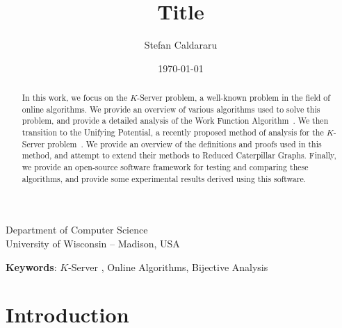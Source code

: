 \documentclass[11pt]{article}
\title{Title}
\author[1]{Stefan Caldararu}
\affil[1]{Undergraduate Student with Department of Computer Science, UW-Madison}
\date{\today}                     %
\newcommand{\KS}{$K$-Server }
\theoremstyle{definition}
\begin{document}
\maketitle

\begin{center}
	Department of Computer Science\\
	University of Wisconsin -- Madison, USA
\end{center}
\vspace{1.5in}
\begin{abstract} 
	In this work, we focus on the \KS problem, a well-known problem in the field of online algorithms. We provide an overview of various algorithms used to solve this problem, and provide a detailed analysis of the Work Function Algorithm~\cite{KS1990, OnlineComp1998}. We then transition to the Unifying Potential, a recently proposed method of analysis for the \KS problem~\cite{unifyingPotential2021}. We provide an overview of the definitions and proofs used in this method, and attempt to extend their methods to Reduced Caterpillar Graphs. Finally, we provide an open-source software framework for testing and comparing these algorithms, and provide some experimental results derived using this software.
\end{abstract}

{\textbf{Keywords}}: \KS, Online Algorithms, Bijective Analysis

\newpage 
\tableofcontents

\newpage

\section{Introduction}
\label{sec:intro}

\end{document}
